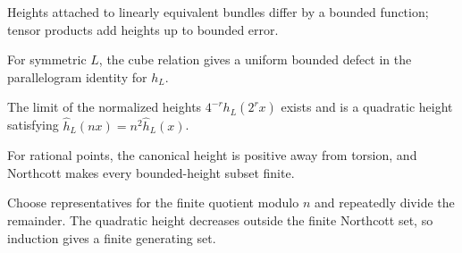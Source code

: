 \begin{proposition}
\label{mumford-app2-height-comparison-proposition}
Heights attached to linearly equivalent bundles differ by a bounded function;
tensor products add heights up to bounded error.
\notready
\end{proposition}

\begin{lemma}
\label{mumford-app2-approximate-quadratic-lemma}
For symmetric $L$, the cube relation gives a uniform bounded defect in the
parallelogram identity for $h_L$.
\notready
\end{lemma}

\begin{theorem}
\label{mumford-app2-tate-height}
The limit of the normalized heights $4^{-r}h_L(2^rx)$ exists and is a quadratic
height satisfying $\widehat h_L(nx)=n^2\widehat h_L(x)$.
\notready
\end{theorem}

\begin{proposition}
\label{mumford-app2-height-positivity-finiteness}
For rational points, the canonical height is positive away from torsion, and
Northcott makes every bounded-height subset finite.
\notready
\end{proposition}

\begin{remark}
\label{mumford-app2-final-descent}
Choose representatives for the finite quotient modulo $n$ and repeatedly divide
the remainder.  The quadratic height decreases outside the finite Northcott
set, so induction gives a finite generating set.
\notready
\end{remark}
